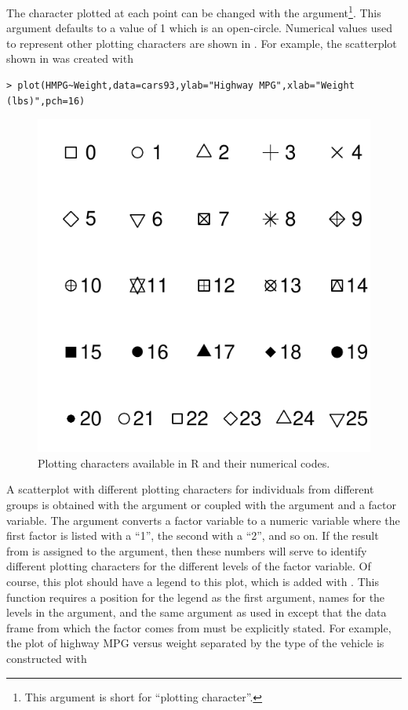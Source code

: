 \documentclass[10pt,openany]{book}\usepackage[]{graphicx}\usepackage[]{color}
\makeatletter
\newenvironment{kframe}{%
 \def\at@end@of@kframe{}%
 \ifinner\ifhmode%
  \def\at@end@of@kframe{\end{minipage}}%
  \begin{minipage}{\columnwidth}%
 \fi\fi%
 \def\FrameCommand##1{\hskip\@totalleftmargin \hskip-\fboxsep
 \colorbox{shadecolor}{##1}\hskip-\fboxsep
     \hskip-\linewidth \hskip-\@totalleftmargin \hskip\columnwidth}%
 \MakeFramed {\advance\hsize-\width
   \@totalleftmargin\z@ \linewidth\hsize
   \@setminipage}}%
 {\par\unskip\endMakeFramed%
 \at@end@of@kframe}
\newenvironment{knitrout}{}{} %
\makeatother
\begin{document}
The character plotted at each point can be changed with the  argument\footnote{This argument is short for ``plotting character''.}.  This argument defaults to a value of 1 which is an open-circle.  Numerical values used to represent other plotting characters are shown in .  For example, the scatterplot shown in  was created with
\begin{knitrout}
\color{fgcolor}\begin{kframe}
\begin{verbatim}
> plot(HMPG~Weight,data=cars93,ylab="Highway MPG",xlab="Weight (lbs)",pch=16)
\end{verbatim}
\end{kframe}
\end{knitrout}

\begin{knitrout}
\color{fgcolor}\begin{figure}[hbtp]

{\centering \includegraphics[width=.4\linewidth]{Figs/Rpch-1} 

}

\caption[Plotting characters available in R and their numerical codes]{Plotting characters available in R and their numerical codes.}\label{fig:Rpch}
\end{figure}


\end{knitrout}

A scatterplot with different plotting characters for individuals from different groups is obtained with the  argument or  coupled with the  argument and a factor variable.  The  argument converts a factor variable to a numeric variable where the first factor is listed with a ``1'', the second with a ``2'', and so on.  If the result from   is assigned to the  argument, then these numbers will serve to identify different plotting characters for the different levels of the factor variable.  Of course, this plot should have a legend to this plot, which is added with .  This function requires a position for the legend as the first argument, names for the levels in the  argument, and the same  argument as used in  except that the data frame from which the factor comes from must be explicitly stated.  For example, the plot of highway MPG versus weight separated by the type of the vehicle  is constructed with
\end{document}
